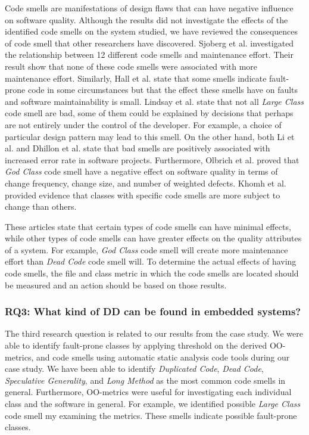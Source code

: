 Code smells are manifestations of design flaws that can have negative influence on software quality. Although the results did not investigate the effects of the identified code smells on the system studied, we have reviewed the consequences of code smell that other researchers have discovered. Sjoberg et al.\cite{sjoberg2013quantifying} investigated the relationship between 12 different code smells and maintenance effort. Their result show that none of these code smells were associated with more maintenance effort. Similarly, Hall et al.\cite{hall2014some} state that some smells indicate fault-prone code in some circumstances but that the effect these smells have on faults and software maintainability is small. Lindsay et al.\cite{lindsay2010does} state that not all \textit{Large Class} code smell are bad, some of them could be explained by decisions that perhaps are not entirely under the control of the developer. For example, a choice of particular design pattern may lead to this smell. On the other hand, both Li et al.\cite{li2007empirical} and Dhillon et al.\cite{dhillon2012can} state that bad smells are positively associated with increased error rate in software projects. Furthermore, Olbrich et al.\cite{olbrich2010all} proved that \textit{God Class} code smell have a negative effect on software quality in terms of change frequency, change size, and number of weighted defects. Khomh et al.\cite{khomh2009exploratory} provided evidence that classes with specific code smells are more subject to change than others. 

These articles state that certain types of code smells can have minimal effects, while other types of code smells can have greater effects on the quality attributes of a system. For example, \textit{God Class} code smell will create more maintenance effort than \textit{Dead Code} code smell will. To determine the actual effects of having code smells, the file and class metric in which the code smells are located should be measured and an action should be based on those results.


\subsubsection{RQ3: What kind of DD can be found in embedded systems?} 
The third research question is related to our results from the case study. We were able to identify fault-prone classes by applying threshold on the derived OO-metrics, and code smells using automatic static analysis code tools during our case study. We have been able to identify \textit{Duplicated Code}, \textit{Dead Code}, \textit{Speculative Generality}, and \textit{Long Method} as the most common code smells in general. Furthermore, OO-metrics were useful for investigating each individual class and the software in general. For example, we identified possible \textit{Large Class} code smell my examining the metrics. These smells indicate possible fault-prone classes.

